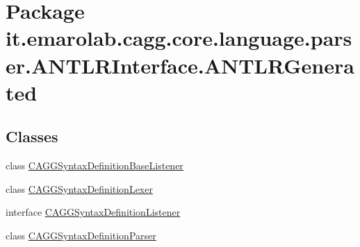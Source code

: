 \hypertarget{namespaceit_1_1emarolab_1_1cagg_1_1core_1_1language_1_1parser_1_1ANTLRInterface_1_1ANTLRGenerated}{\section{Package it.\-emarolab.\-cagg.\-core.\-language.\-parser.\-A\-N\-T\-L\-R\-Interface.\-A\-N\-T\-L\-R\-Generated}
\label{namespaceit_1_1emarolab_1_1cagg_1_1core_1_1language_1_1parser_1_1ANTLRInterface_1_1ANTLRGenerated}
}
\subsection*{Classes}
\begin{DoxyCompactItemize}
\item 
class \hyperlink{classit_1_1emarolab_1_1cagg_1_1core_1_1language_1_1parser_1_1ANTLRInterface_1_1ANTLRGenerated_1_1a45b55289931e185944c10a916c8cdd}{C\-A\-G\-G\-Syntax\-Definition\-Base\-Listener}
\item 
class \hyperlink{classit_1_1emarolab_1_1cagg_1_1core_1_1language_1_1parser_1_1ANTLRInterface_1_1ANTLRGenerated_1_1CAGGSyntaxDefinitionLexer}{C\-A\-G\-G\-Syntax\-Definition\-Lexer}
\item 
interface \hyperlink{interfaceit_1_1emarolab_1_1cagg_1_1core_1_1language_1_1parser_1_1ANTLRInterface_1_1ANTLRGenerate8f089aac366bd2683be460c907cc6185}{C\-A\-G\-G\-Syntax\-Definition\-Listener}
\item 
class \hyperlink{classit_1_1emarolab_1_1cagg_1_1core_1_1language_1_1parser_1_1ANTLRInterface_1_1ANTLRGenerated_1_1CAGGSyntaxDefinitionParser}{C\-A\-G\-G\-Syntax\-Definition\-Parser}
\end{DoxyCompactItemize}
